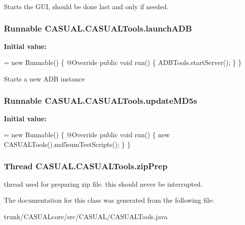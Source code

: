 Starts the G\-U\-I, should be done last and only if needed. \hypertarget{classCASUAL_1_1CASUALTools_ad38bf5c13e68a0c568594e95ab0ef15a}{
\subsubsection[{launch\-A\-D\-B}]{\setlength{\rightskip}{0pt plus 5cm}Runnable C\-A\-S\-U\-A\-L.\-C\-A\-S\-U\-A\-L\-Tools.\-launch\-A\-D\-B}}\label{classCASUAL_1_1CASUALTools_ad38bf5c13e68a0c568594e95ab0ef15a}
{\bfseries Initial value\-:}
\begin{DoxyCode}
= \textcolor{keyword}{new} Runnable() \{
        @Override
        \textcolor{keyword}{public} \textcolor{keywordtype}{void} run() \{
            ADBTools.startServer();
        \}
    \}
\end{DoxyCode}
Starts a new A\-D\-B instance \hypertarget{classCASUAL_1_1CASUALTools_a088dc8e9b33d91de1410b126c007cc70}{
\subsubsection[{update\-M\-D5s}]{\setlength{\rightskip}{0pt plus 5cm}Runnable C\-A\-S\-U\-A\-L.\-C\-A\-S\-U\-A\-L\-Tools.\-update\-M\-D5s\hspace{0.3cm}{\ttfamily [static]}}}\label{classCASUAL_1_1CASUALTools_a088dc8e9b33d91de1410b126c007cc70}
{\bfseries Initial value\-:}
\begin{DoxyCode}
= \textcolor{keyword}{new} Runnable() \{
        @Override
        \textcolor{keyword}{public} \textcolor{keywordtype}{void} run() \{
            \textcolor{keyword}{new} CASUALTools().md5sumTestScripts();
        \}
    \}
\end{DoxyCode}
\hypertarget{classCASUAL_1_1CASUALTools_acc2a43a69c74b1f73df4ce08f2bad7bf}{
\subsubsection[{zip\-Prep}]{\setlength{\rightskip}{0pt plus 5cm}Thread C\-A\-S\-U\-A\-L.\-C\-A\-S\-U\-A\-L\-Tools.\-zip\-Prep\hspace{0.3cm}{\ttfamily [static]}}}\label{classCASUAL_1_1CASUALTools_acc2a43a69c74b1f73df4ce08f2bad7bf}
thread used for preparing zip file. this should never be interrupted. 

The documentation for this class was generated from the following file\-:\begin{DoxyCompactItemize}
\item 
trunk/\-C\-A\-S\-U\-A\-Lcore/src/\-C\-A\-S\-U\-A\-L/C\-A\-S\-U\-A\-L\-Tools.\-java\end{DoxyCompactItemize}
